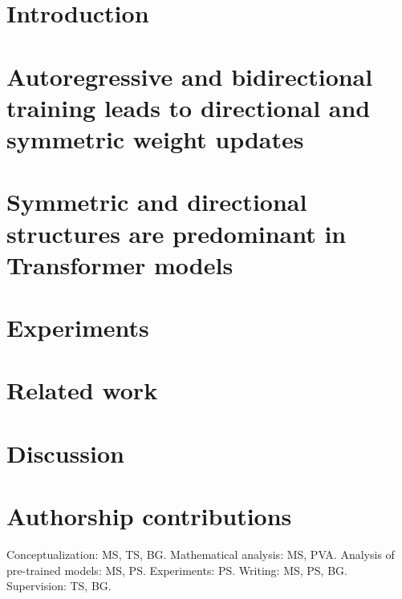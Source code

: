\documentclass{article}
\theoremstyle{plain}
\theoremstyle{definition}
\theoremstyle{remark}
\begin{document}
\printAffiliationsAndNotice{\icmlEqualContribution} %

\begin{abstract}

\end{abstract}

\section{Introduction}
\label{sec-introduction}


\section{Autoregressive and bidirectional training leads to directional and symmetric weight updates}
\label{sec-results-math}

%


\section{Symmetric and directional structures are predominant in Transformer models}
\label{sec-results-pretrained-models}


%

\section{Experiments}
\label{sec–results–experiments}


\section{Related work}
\label{sec-related-work}


\section{Discussion}
\label{sec–discussion}


%
\section*{Authorship contributions}
%
Conceptualization: MS, TS, BG. 
%
Mathematical analysis: MS, PVA. 
%
Analysis of pre-trained models: MS, PS.
%
Experiments: PS. 
%
Writing: MS, PS, BG. 
%
Supervision: TS, BG. 
%
\end{document}
